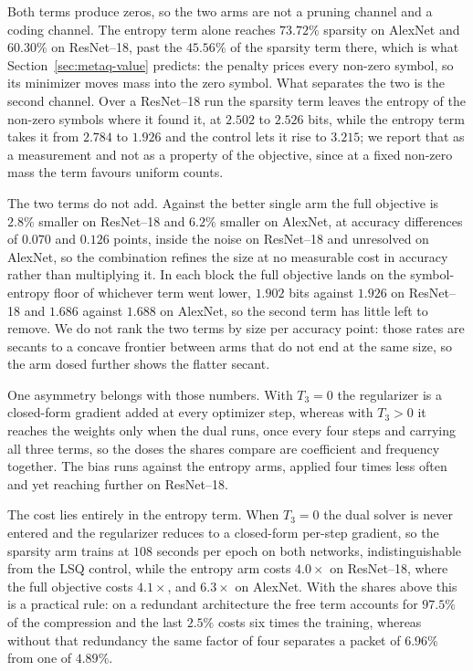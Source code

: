 \documentclass{article}
\begin{document}
Both terms produce zeros, so the two arms are not a pruning channel and a coding
channel. The entropy term alone reaches $73.72\%$ sparsity on AlexNet and
$60.30\%$ on ResNet--18, past the $45.56\%$ of the sparsity term there, which is
what Section~\ref{sec:metaq-value} predicts: the penalty prices every non-zero
symbol, so its minimizer moves mass into the zero symbol. What separates the two
is the second channel. Over a ResNet--18 run the sparsity term leaves the entropy
of the non-zero symbols where it found it, at $2.502$ to $2.526$ bits, while the
entropy term takes it from $2.784$ to $1.926$ and the control lets it rise to
$3.215$; we report that as a measurement and not as a property of the objective,
since at a fixed non-zero mass the term favours uniform counts.

The two terms do not add. Against the better single arm the full objective is
$2.8\%$ smaller on ResNet--18 and $6.2\%$ smaller on AlexNet, at accuracy
differences of $0.070$ and $0.126$ points, inside the noise on ResNet--18 and
unresolved on AlexNet, so the combination refines the size at no measurable cost
in accuracy rather than multiplying it. In each block the full objective lands on
the symbol-entropy floor of whichever term went lower, $1.902$ bits against
$1.926$ on ResNet--18 and $1.686$ against $1.688$ on AlexNet, so the second term
has little left to remove. We do not rank the two terms by size per accuracy
point: those rates are secants to a concave frontier between arms that do not end
at the same size, so the arm dosed further shows the flatter secant.

One asymmetry belongs with those numbers. With $T_3=0$ the regularizer is a
closed-form gradient added at every optimizer step, whereas with $T_3>0$ it
reaches the weights only when the dual runs, once every four steps and carrying
all three terms, so the doses the shares compare are coefficient and frequency
together. The bias runs against the entropy arms, applied four times less often
and yet reaching further on ResNet--18.

The cost lies entirely in the entropy term. When $T_3=0$ the dual solver is never
entered and the regularizer reduces to a closed-form per-step gradient, so the
sparsity arm trains at $108$ seconds per epoch on both networks, indistinguishable
from the LSQ control, while the entropy arm costs $4.0\times$ on ResNet--18, where
the full objective costs $4.1\times$, and $6.3\times$ on AlexNet. With the shares above this is a practical rule: on a
redundant architecture the free term accounts for $97.5\%$ of the compression and
the last $2.5\%$ costs six times the training, whereas without that redundancy the
same factor of four separates a packet of $6.96\%$ from one of $4.89\%$.
\end{document}
